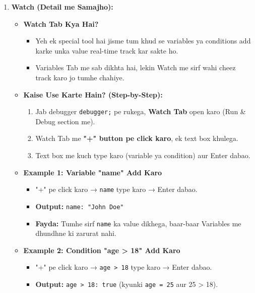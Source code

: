 \documentclass[a4paper,12pt]{article}
\begin{document}
\begin{enumerate}
    \item \textbf{\color{myblue}Watch (Detail me Samajho):}  
    \begin{itemize}
        \item \textbf{\color{myblue}Watch Tab Kya Hai?}  
        \begin{itemize}
            \item Yeh ek special tool hai jisme tum khud se variables ya conditions add karke unka value real-time track kar sakte ho.
            \item Variables Tab me sab dikhta hai, lekin Watch me sirf wahi cheez track karo jo tumhe chahiye.
        \end{itemize}
        \item \textbf{\color{myblue}Kaise Use Karte Hain? (Step-by-Step):}  
        \begin{enumerate}
            \item Jab debugger \texttt{\color{mygreen}debugger;} pe rukega, \textbf{\color{myblue}Watch Tab} open karo (Run \& Debug section me).
            \item Watch Tab me \textbf{\color{myblue}"+" button pe click karo}, ek text box khulega.
            \item Text box me kuch type karo (variable ya condition) aur Enter dabao.
        \end{enumerate}
        \item \textbf{\color{myblue}Example 1: Variable "name" Add Karo}  
        \begin{itemize}
            \item "+" pe click karo → \texttt{\color{mygreen}name} type karo → Enter dabao.
            \item \textbf{\color{myblue}Output:} \texttt{\color{mygreen}name: "John Doe"}
            \item \textbf{\color{myblue}Fayda:} Tumhe sirf \texttt{\color{mygreen}name} ka value dikhega, baar-baar Variables me dhundhne ki zarurat nahi.
        \end{itemize}
        \item \textbf{\color{myblue}Example 2: Condition "age > 18" Add Karo}  
        \begin{itemize}
            \item "+" pe click karo → \texttt{\color{mygreen}age > 18} type karo → Enter dabao.
            \item \textbf{\color{myblue}Output:} \texttt{\color{mygreen}age > 18: true} (kyunki \texttt{\color{mygreen}age = 25} aur 25 > 18).

\end{itemize}
\end{itemize}
\end{enumerate}
\end{document}
